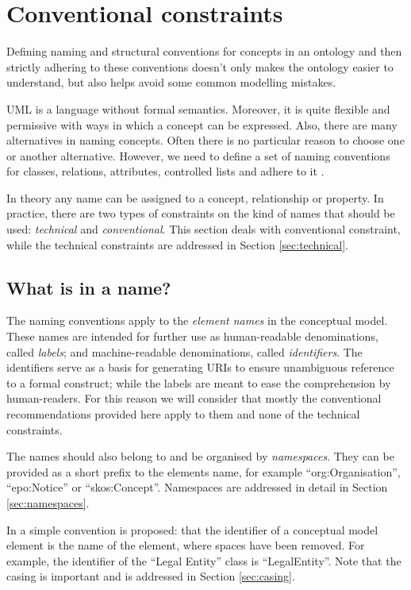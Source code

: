 \section{Conventional constraints}
\label{sec:conventional}

	Defining naming and structural conventions for concepts in an ontology and then strictly adhering to these conventions doesn't only makes the ontology easier to understand, but also helps avoid some common modelling mistakes. 
	
	UML is a language without formal semantics. Moreover, it is quite flexible and permissive with ways in which a concept can be expressed. Also, there are many alternatives in naming concepts. Often there is no particular reason to choose one or another alternative. However, we need to define a set of naming conventions for classes, relations, attributes, controlled lists and adhere to it \cite{noy2001}.

	In theory any name can be assigned to a concept, relationship or property. In practice, there are two types of constraints on the kind of names that should be used: \textit{technical} and \textit{conventional}. This section deals with conventional constraint, while the technical constraints are addressed in Section \ref{sec:technical}.
	
	\subsection{What is in a name?}
	\label{sec:name}
		
	The naming conventions apply to the \textit{element names} in the conceptual model. These names are intended for further use as human-readable denominations, called \textit{labels}; and machine-readable denominations, called \textit{identifiers}. The identifiers serve as a basis for generating URIs \cite{rfc3986} to ensure unambiguous reference to a formal construct; while the labels are meant to ease the comprehension by human-readers. For this reason we will consider that mostly the conventional recommendations provided here apply to them and none of the technical constraints.

	The names should also belong to and be organised by \textit{namespaces}. They can be provided as a short prefix to the elements name, for example ``org:Organisation'', ``epo:Notice'' or ``skos:Concept''. Namespaces are addressed in detail in Section \ref{sec:namespaces}.
	
	In \cite{isaHandbook2015} a simple convention is proposed: that the identifier of a conceptual model element is the name of the element, where spaces have been removed. For example, the identifier of the ``Legal Entity'' class is ``LegalEntity''. Note that the casing is important and is addressed in Section \ref{sec:casing}.
	
